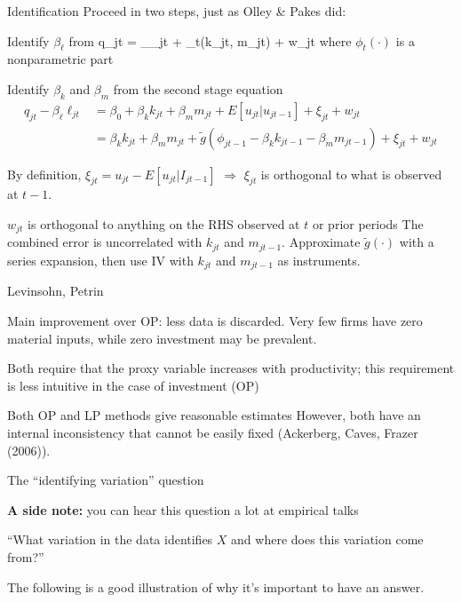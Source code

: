 \begin{frame}{Identification}
	Proceed in two steps, just as Olley \& Pakes did:
	\begin{enumerate}
		\item{Identify $\beta_\ell$ from
		\be
			q_{jt} = \beta_\ell\ell_{jt} + \phi_t(k_{jt}, m_{jt}) + w_{jt}
		\ee
		where $\phi_t(\cdot)$ is a nonparametric part}
		\item{Identify $\beta_k$ and $\beta_m$ from the second stage equation
		\begin{align*}
			q_{jt} - \beta_\ell\ell_{jt} &= \beta_0 + \beta_kk_{jt} + \beta_mm_{jt} + E[u_{jt}|u_{jt-1}] + \xi_{jt} + w_{jt}\\
			& = \beta_kk_{jt} + \beta_mm_{jt} + \widetilde{g}(\phi_{jt-1} - \beta_kk_{jt-1} - \beta_mm_{jt-1}) + \xi_{jt} + w_{jt}
		\end{align*}
		\bi
			\item{}By definition, $\xi_{jt} = u_{jt} - E[u_{jt}|I_{jt-1}]$ $\Longrightarrow$ $\xi_{jt}$ is orthogonal to what is observed at $t-1$.
			\item{}$w_{jt}$ is orthogonal to anything on the RHS observed at $t$ or prior periods
		\ei
		The combined error is uncorrelated with $k_{jt}$ and $m_{jt-1}$. Approximate $\widetilde{g}(\cdot)$ with a series expansion, then use IV with $k_{jt}$ and $m_{jt-1}$ as instruments.}
	\end{enumerate}
\end{frame}

\begin{frame}{Levinsohn, Petrin}
	\bi
		\item{Main improvement over OP: less data is discarded. Very few firms have zero material inputs, while zero investment may be prevalent.}
		\item{Both require that the proxy variable increases with productivity; this requirement is less intuitive in the case of investment (OP)}
		\item{Both OP and LP methods give reasonable estimates}
	\ei
	However, both have an internal inconsistency that cannot be easily fixed (Ackerberg, Caves, Frazer (2006)).
\end{frame}


\begin{frame}{The ``identifying variation'' question}

\textbf{A side note:} you can hear this question a lot at empirical talks
\begin{block}{}
``What variation in the data identifies $X$ and where does this variation come from?''
\end{block}
The following is a good illustration of why it's important to have an answer.
\end{frame}

